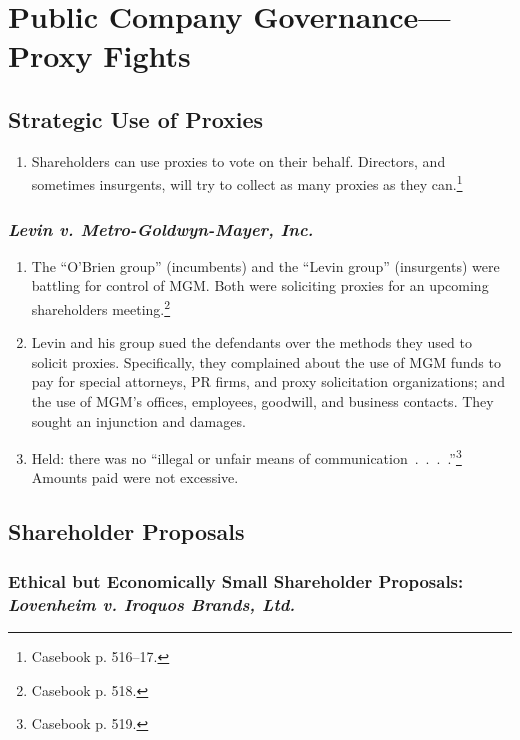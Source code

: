 \section{Public Company Governance---Proxy Fights}

\subsection{Strategic Use of Proxies}

\begin{enumerate}
    \item Shareholders can use proxies to vote on their behalf. Directors, and 
    sometimes insurgents, will try to collect as many proxies as they 
    can.\footnote{Casebook p. 516--17.}
\end{enumerate}

\subsubsection{\emph{Levin v. Metro-Goldwyn-Mayer, Inc.}}

\begin{enumerate}
    \item The ``O'Brien group'' (incumbents) and the ``Levin group'' 
    (insurgents) were battling for control of MGM. Both were soliciting proxies 
    for an upcoming shareholders meeting.\footnote{Casebook p. 518.}
    \item Levin and his group sued the defendants over the methods they used to 
    solicit proxies. Specifically, they complained about the use of MGM funds to 
    pay for special attorneys, PR firms, and proxy solicitation organizations; 
    and the use of MGM's offices, employees, goodwill, and business contacts. 
    They sought an injunction and damages.
    \item Held: there was no ``illegal or unfair means of 
    communication~.~.~.~.''\footnote{Casebook p. 519.} Amounts paid were not 
    excessive.
\end{enumerate}

\subsection{Shareholder Proposals}

\subsubsection{Ethical but Economically Small Shareholder Proposals: 
\emph{Lovenheim v. Iroquos Brands, Ltd.}}

